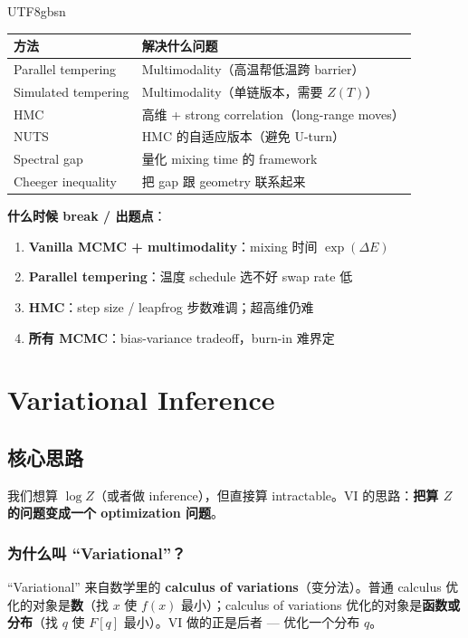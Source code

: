 \documentclass[11pt]{article}
\begin{document}
\begin{CJK}{UTF8}{gbsn}
\begin{center}
\begin{tabular}{|l|l|}
\hline
方法 & 解决什么问题 \\
\hline
Parallel tempering & Multimodality（高温帮低温跨 barrier） \\
Simulated tempering & Multimodality（单链版本，需要 $Z(T)$） \\
HMC & 高维 + strong correlation（long-range moves） \\
NUTS & HMC 的自适应版本（避免 U-turn） \\
Spectral gap & 量化 mixing time 的 framework \\
Cheeger inequality & 把 gap 跟 geometry 联系起来 \\
\hline
\end{tabular}
\end{center}

\textbf{什么时候 break / 出题点}：
\begin{enumerate}[nosep]
  \item \textbf{Vanilla MCMC + multimodality}：mixing 时间 $\exp(\Delta E)$
  \item \textbf{Parallel tempering}：温度 schedule 选不好 swap rate 低
  \item \textbf{HMC}：step size / leapfrog 步数难调；超高维仍难
  \item \textbf{所有 MCMC}：bias-variance tradeoff，burn-in 难界定
\end{enumerate}

\section{Variational Inference}

\subsection{核心思路}

我们想算 $\log Z$（或者做 inference），但直接算 intractable。VI 的思路：\textbf{把算 $Z$ 的问题变成一个 optimization 问题}。

\subsubsection{为什么叫 ``Variational''？}

``Variational'' 来自数学里的 \textbf{calculus of variations}（变分法）。普通 calculus 优化的对象是\textbf{数}（找 $x$ 使 $f(x)$ 最小）；calculus of variations 优化的对象是\textbf{函数或分布}（找 $q$ 使 $F[q]$ 最小）。VI 做的正是后者 --- 优化一个分布 $q$。


\end{CJK}
\end{document}
